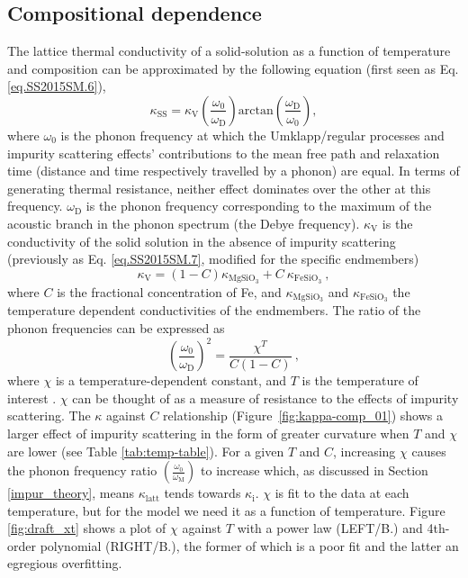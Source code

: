  
 
 
 
\subsection{Compositional dependence}

The lattice thermal conductivity of a solid-solution as a function of temperature and composition can be approximated by the following equation (first seen as Eq. \ref{eq.SS2015SM.6}),
%
\begin{equation}
\kappa_{\mathrm{SS}}=\kappa_{\mathrm{V}}\left ( \frac{\omega_{\mathrm{0}}}{\omega_{\mathrm{D}}} \right )\mathrm{arctan}\left ( \frac{\omega_{\mathrm{D}}}{\omega_{\mathrm{0}}} \right ),
\label{eq.ohta7}
\end{equation}
%
where $\omega_{\mathrm{0}}$ is the phonon frequency at which the Umklapp/regular processes and impurity scattering effects' contributions to the mean free path and relaxation time (distance and time respectively travelled by a phonon) are equal. In terms of generating thermal resistance, neither effect dominates over the other at this frequency. $\omega_{\mathrm{D}}$ is the phonon frequency corresponding to the maximum of the acoustic branch in the phonon spectrum (the Debye frequency). $\kappa_{\mathrm{V}}$ is the conductivity of the solid solution in the absence of impurity scattering (previously as Eq. \ref{eq.SS2015SM.7}, modified for the specific \mgfesios endmembers)
%
\begin{equation}
\kappa_{\mathrm{V}}=\left ( 1-C \right )\kappa_{\mathrm{MgSiO_{3}}}+C\ \kappa_{\mathrm{FeSiO_{3}}}\ ,
\label{eq.ohta9}
\end{equation}
%
where $C$ is the fractional concentration of Fe, and $\kappa_{\mathrm{MgSiO_{3}}}$ and $\kappa_{\mathrm{FeSiO_{3}}}$ the temperature dependent conductivities of the endmembers. The ratio of the phonon frequencies can be expressed as
%
\begin{equation}
\left ( \frac{\omega_{\mathrm{0}}}{\omega_{\mathrm{D}}} \right )^{2}=\frac{\chi^{T}}{C\left ( 1-C \right )}\ ,
\label{eq.ohta8}
\end{equation}
%
where $\chi$ is a temperature-dependent constant, and $T$ is the temperature of interest \citep{Padture1997}. $\chi$ can be thought of as a measure of resistance to the effects of impurity scattering. The $\kappa$ against $C$ relationship (Figure~\ref{fig:kappa-comp_01}) shows a larger effect of impurity scattering in the form of greater curvature when $T$ and $\chi$ are lower (see Table \ref{tab:temp-table}). For a given $T$ and $C$, increasing $\chi$ causes the phonon frequency ratio $\left ( \frac{\omega_{\mathrm{0}}}{\omega_{\mathrm{M}}}\right )$ to increase which, as discussed in Section \ref{impur_theory}, means $\kappa_{\mathrm{latt}}$ tends towards $\kappa_{\mathrm{i}}$. $\chi$ is fit to the data at each temperature, but for the model we need it as a function of temperature. Figure \ref{fig:draft_xt} shows a plot of $\chi$ against $T$ with a power law (LEFT/B.) and 4th-order polynomial (RIGHT/B.), the former of which is a poor fit and the latter an egregious overfitting. 

